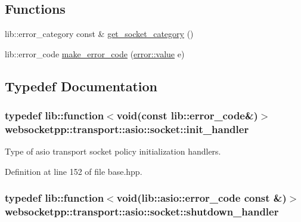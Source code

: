 \subsection*{Functions}
\begin{DoxyCompactItemize}
\item 
lib\+::error\+\_\+category const \& \hyperlink{namespacewebsocketpp_1_1transport_1_1asio_1_1socket_afaeeedd853a7c7793a4c7f9646d6886f}{get\+\_\+socket\+\_\+category} ()
\item 
lib\+::error\+\_\+code \hyperlink{namespacewebsocketpp_1_1transport_1_1asio_1_1socket_a9e5cb8d54b6d0d1376168955a99fe458}{make\+\_\+error\+\_\+code} (\hyperlink{namespacewebsocketpp_1_1transport_1_1asio_1_1socket_1_1error_a828ddaa5ed63a761e1b557465a35f05a}{error\+::value} e)
\end{DoxyCompactItemize}


\subsection{Typedef Documentation}
\hypertarget{namespacewebsocketpp_1_1transport_1_1asio_1_1socket_a2eda0fed502e748230883016b3fb3e82}{}
\subsubsection[{init\+\_\+handler}]{\setlength{\rightskip}{0pt plus 5cm}typedef lib\+::function$<$void(const lib\+::error\+\_\+code\&)$>$ {\bf websocketpp\+::transport\+::asio\+::socket\+::init\+\_\+handler}}\label{namespacewebsocketpp_1_1transport_1_1asio_1_1socket_a2eda0fed502e748230883016b3fb3e82}


Type of asio transport socket policy initialization handlers. 



Definition at line 152 of file base.\+hpp.

\hypertarget{namespacewebsocketpp_1_1transport_1_1asio_1_1socket_a864ed8b0d8fa1a92a5f016c112efc4ad}{}
\subsubsection[{shutdown\+\_\+handler}]{\setlength{\rightskip}{0pt plus 5cm}typedef lib\+::function$<$void(lib\+::asio\+::error\+\_\+code const \&)$>$ {\bf websocketpp\+::transport\+::asio\+::socket\+::shutdown\+\_\+handler}}\label{namespacewebsocketpp_1_1transport_1_1asio_1_1socket_a864ed8b0d8fa1a92a5f016c112efc4ad}


